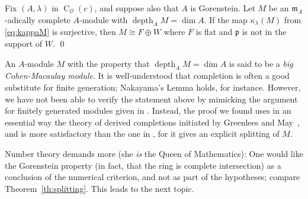 \documentclass[twoside,leqno]{article}
\newcommand{\cato}{\operatorname{C}}
\newcommand{\depth}{\operatorname{depth}}
\newcommand{\fm}{{\mathfrak m}}
\newcommand{\fp}{{\mathfrak p}}
\newcommand{\mco}{\mathcal O}
\begin{document}
\begin{theorem}
        \label{th:bigdeal}
Fix $(A,\lambda)$ in $\cato_{\mco}(c)$, and suppose also that $A$ is Gorenstein. Let $M$ be an $\fm_A$-adically complete $A$-module with $\depth_AM =\dim A$. If the map $\kappa_\lambda(M)$ from \eqref{eq:kappaM} is surjective, then $M\cong F\oplus W$ where $F$ is flat and $\fp$ is not in the support of $W$. \qed
    \end{theorem}

An $A$-module $M$ with the property that $\depth_AM=\dim A$ is said to be a \emph{big Cohen-Macaulay module}.
It is well-understood that  completion is often a good substitute for finite generation; Nakayama's Lemma holds, for instance. However, we have not been able to verify the statement above by mimicking the argument for finitely generated modules given in \cite[Theorem~9.2]{Iyengar/Khare/Manning:2024a}. Instead, the proof we found uses in an essential way the theory of derived completions initiated by Greenlees and May~\cite{Greenlees/May:1992a}, and is more satisfactory than the one in \cite{Iyengar/Khare/Manning:2024a}, for it gives an explicit splitting of $M$. 

Number theory demands more (she \emph{is} the Queen of Mathematics): One would like the Gorenstein property (in fact, that the ring is complete intersection) as a conclusion of the numerical criterion, and not as part of the hypotheses; compare Theorem~\ref{th:splitting}. This leads to the next topic.
\end{document}

